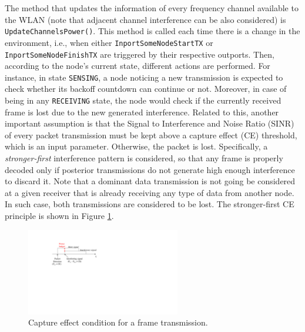 \documentclass[a4paper]{article}
\begin{document}
	The method that updates the information of every frequency channel available to the WLAN (note that adjacent channel interference can be also considered) is \texttt{UpdateChannelsPower()}. This method is called each time there is a change in the environment, i.e., when either \texttt{InportSomeNodeStartTX} or \texttt{InportSomeNodeFinishTX} are triggered by their respective outports. Then, according to the node's current state, different actions are performed. For instance, in state \texttt{SENSING}, a node noticing a new transmission is expected to check whether its backoff countdown can continue or not. Moreover, in case of being in any \texttt{RECEIVING} state, the node would check if the currently received frame is lost due to the new generated interference. Related to this, another important assumption is that the Signal to Interference and Noise Ratio (SINR) of every packet transmission must be kept above a capture effect (CE) threshold, which is an input parameter. Otherwise, the packet is lost. Specifically, a \emph{stronger-first} interference pattern is considered, so that any frame is properly decoded only if posterior transmissions do not generate high enough interference to discard it. Note that a dominant data transmission is not going be considered at a given receiver that is already receiving any type of data from another node. In such case, both transmissions are considered to be lost. The stronger-first CE principle is shown in Figure \ref{fig:capture_effect}. 
	\begin{figure}[h]
		\centering
		\includegraphics[width=0.6\textwidth]{images/capture_effect.pdf}
		\caption{Capture effect condition for a frame transmission.}    
		\label{fig:capture_effect}
	\end{figure}
	
\end{document}
